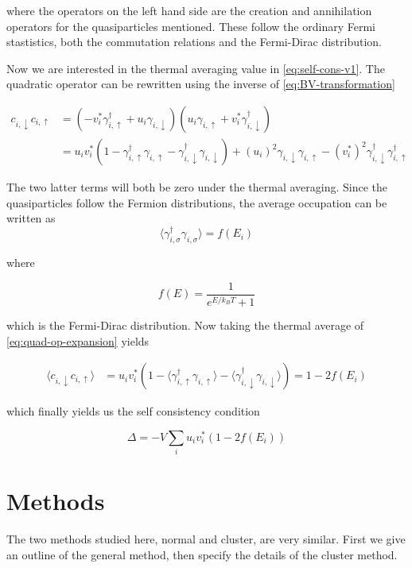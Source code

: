 \documentclass[11pt]{article}
\begin{document}
where the operators on the left hand side are the creation and annihilation operators for the quasiparticles mentioned. These follow the ordinary Fermi stastistics, both the commutation relations and the Fermi-Dirac distribution. 

Now we are interested in the thermal averaging value in \eqref{eq:self-cons-v1}. The quadratic operator can be rewritten using the inverse of \eqref{eq:BV-transformation}

\begin{align}\label{eq:quad-op-expansion}
	c_{i,\downarrow} c_{i,\uparrow} &= (-v_i^* \gamma_{i,\uparrow}^\dagger + u_i \gamma_{i,\downarrow})(u_i\gamma_{i,\uparrow} + v_i^* \gamma_{i,\downarrow}^\dagger) \nonumber \\
					&= u_i v_i^*(1 - \gamma_{i,\uparrow}^\dagger\gamma_{i,\uparrow} - \gamma_{i,\downarrow}^\dagger\gamma_{i,\downarrow}) + (u_i)^2 \gamma_{i,\downarrow} \gamma_{i,\uparrow} - (v_i^*)^2\gamma_{i,\downarrow}^\dagger \gamma_{i,\uparrow}^\dagger 
\end{align}

The two latter terms will both be zero under the thermal averaging. Since the quasiparticles follow the Fermion distributions, the average occupation can be written as
\begin{equation}
	\langle \gamma_{i,\sigma}^\dagger \gamma_{i,\sigma} \rangle = f(E_i)
\end{equation}

where

\begin{equation}
	f(E) = \frac{1}{e^{E/k_BT} + 1}
\end{equation}

which is the Fermi-Dirac distribution. Now taking the thermal average of \eqref{eq:quad-op-expansion} yields

\begin{align}
	\langle c_{i,\downarrow} c_{i,\uparrow} \rangle &=  u_i v_i^*(1 - \langle \gamma_{i,\uparrow}^\dagger\gamma_{i,\uparrow} \rangle  - \langle \gamma_{i,\downarrow}^\dagger\gamma_{i,\downarrow} \rangle ) = 1 - 2f(E_i)
\end{align}

which finally yields us the self consistency condition

\begin{equation}
	\Delta = -V \sum_i u_i v_i^* (1 - 2f(E_i))
\end{equation}


\section{Methods}\label{sec:methods}
The two methods studied here, normal and cluster, are very similar. First we give an outline of the general method, then specify the details of the cluster method. 
\end{document}
